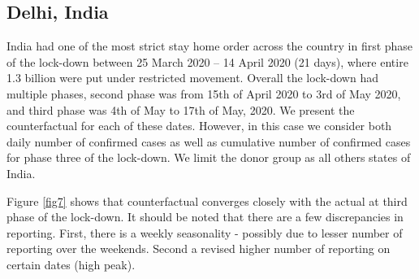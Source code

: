 \documentclass[preprint,authoryear,12pt]{elsarticle}
\begin{document}
	\subsection{Delhi, India}
	India had one of the most strict stay home order across the country in first phase of the lock-down between 25 March 2020 – 14 April 2020 (21 days), where entire 1.3 billion were put under restricted movement. Overall the lock-down had multiple phases, second phase was from 15th of April 2020 to 3rd of May 2020, and third phase was 4th of May to 17th of May, 2020. We present the counterfactual for each of these dates. However, in this case we consider both daily number of confirmed cases as well as cumulative number of confirmed cases for phase three of the lock-down. We limit the donor group as all others states of India.
	
	Figure \ref{fig7} shows that counterfactual converges closely with the actual at third phase of the lock-down.  It should be noted that there are a few discrepancies in reporting. First, there is a weekly seasonality - possibly due to lesser number of reporting over the weekends. Second a revised higher number of reporting on certain dates (high peak).
	
\end{document}

